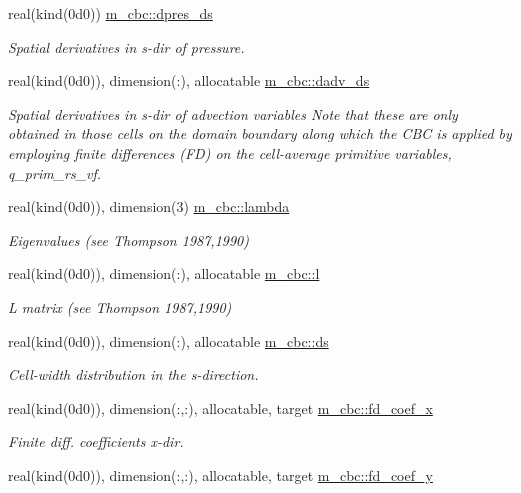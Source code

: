 \begin{DoxyCompactItemize}
real(kind(0d0)) \hyperlink{namespacem__cbc_ae49b66468d949880db575e26231b641c}{m\+\_\+cbc\+::dpres\+\_\+ds}
\begin{DoxyCompactList}\small\item\em Spatial derivatives in s-\/dir of pressure. \end{DoxyCompactList}\item 
real(kind(0d0)), dimension(\+:), allocatable \hyperlink{namespacem__cbc_ad0e1fd6e716ca51ccf5d6954e15fb02e}{m\+\_\+cbc\+::dadv\+\_\+ds}
\begin{DoxyCompactList}\small\item\em Spatial derivatives in s-\/dir of advection variables Note that these are only obtained in those cells on the domain boundary along which the C\+BC is applied by employing finite differences (FD) on the cell-\/average primitive variables, q\+\_\+prim\+\_\+rs\+\_\+vf. \end{DoxyCompactList}\item 
real(kind(0d0)), dimension(3) \hyperlink{namespacem__cbc_a7ff1c86cd167654a9c0765dea4a93ba5}{m\+\_\+cbc\+::lambda}
\begin{DoxyCompactList}\small\item\em Eigenvalues (see Thompson 1987,1990) \end{DoxyCompactList}\item 
real(kind(0d0)), dimension(\+:), allocatable \hyperlink{namespacem__cbc_a44a30ad8ee6642f20f106e99fe3608f9}{m\+\_\+cbc\+::l}
\begin{DoxyCompactList}\small\item\em L matrix (see Thompson 1987,1990) \end{DoxyCompactList}\item 
real(kind(0d0)), dimension(\+:), allocatable \hyperlink{namespacem__cbc_ae49e36ba93b9f5cb3adf9551c1cfb276}{m\+\_\+cbc\+::ds}
\begin{DoxyCompactList}\small\item\em Cell-\/width distribution in the s-\/direction. \end{DoxyCompactList}\item 
real(kind(0d0)), dimension(\+:,\+:), allocatable, target \hyperlink{namespacem__cbc_a6f324c692d5e60e85314b1e21c81736b}{m\+\_\+cbc\+::fd\+\_\+coef\+\_\+x}
\begin{DoxyCompactList}\small\item\em Finite diff. coefficients x-\/dir. \end{DoxyCompactList}\item 
real(kind(0d0)), dimension(\+:,\+:), allocatable, target \hyperlink{namespacem__cbc_ae86e3f027b189005a2b00f8f2bb9ae32}{m\+\_\+cbc\+::fd\+\_\+coef\+\_\+y}

\end{DoxyCompactItemize}
